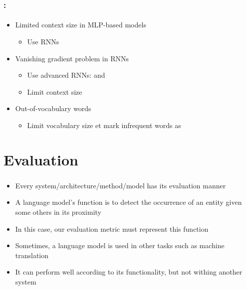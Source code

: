 \documentclass[xcolor=table]{beamer}
\begin{document}
\begin{frame}
	\frametitle{\insertshortsubtitle: \insertsection}
	\framesubtitle{\insertsubsection}

	\begin{itemize}
		\item Limited context size in MLP-based models
		\begin{itemize}
			\item Use RNNs
		\end{itemize}
		\item Vanishing gradient problem in RNNs
		\begin{itemize}
			\item Use advanced RNNs:  and 
			\item Limit context size
		\end{itemize}
		\item Out-of-vocabulary words
		\begin{itemize}
			\item Limit vocabulary size  et mark infrequent words as 
		\end{itemize}
	\end{itemize}

\end{frame}

\section{Evaluation}

\begin{frame}
	\frametitle{\insertshortsubtitle}
	\framesubtitle{\insertsection}
	
	\begin{itemize}
		\item Every system/architecture/method/model has its evaluation manner
		\item A language model's function is to detect the occurrence of an entity given some others in its proximity
		\item In this case, our evaluation metric must represent this function
		\item Sometimes, a language model is used in other tasks such as machine translation
		\item It can perform well according to its functionality, but not withing another system 
	\end{itemize}
	
\end{frame}
\end{document}
